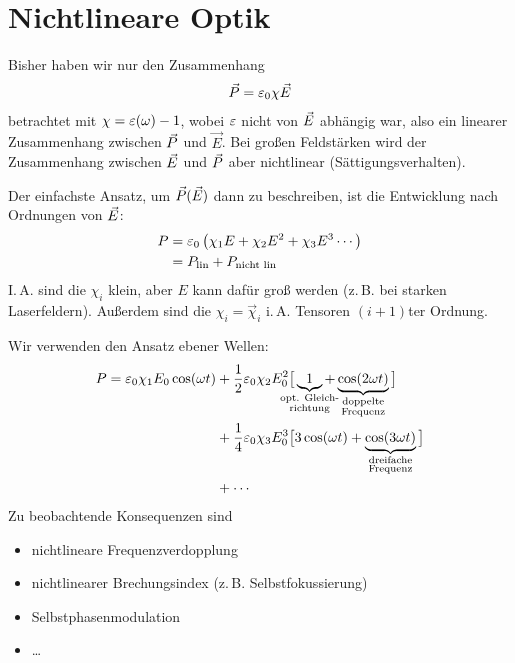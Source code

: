 
\chapter{Nichtlineare Optik}

Bisher haben wir nur den Zusammenhang
\begin{gather*}
  \vec{P} = \varepsilon_0\chi\vec{E}
\end{gather*}
betrachtet mit $\chi=\varepsilon(\omega)-1$, wobei $\varepsilon$ nicht von $\vec{E}$
abhängig war, also ein linearer Zusammenhang zwischen $\vec{P} $ und
$\vec E$.
Bei großen Feldstärken wird der Zusammenhang zwischen $\vec{E} $ und
$\vec{P} $ aber nichtlinear (Sättigungsverhalten).

Der einfachste Ansatz, um $\vec{P}(\vec{E})$ dann zu beschreiben, ist die
Entwicklung nach Ordnungen von $\vec{E} $:
\begin{align*}
  P &= \varepsilon_0 \left(
      \chi_1 E + \chi_2 E^2 + \chi_3 E^3 \dotsb
       \right) \\
    &= P_\text{lin} + P_\text{nicht lin}
\end{align*}
I.\,A. sind die $\chi_i$ klein, aber $E$ kann dafür groß werden
(z.\,B. bei starken Laserfeldern).
Außerdem sind die $\chi_i=\vec{\chi}_i$ i.\,A. Tensoren $(i+1)$ter
Ordnung.

Wir verwenden den Ansatz ebener Wellen:
\begin{align*}
  P = \epso \chi_1 E_0\cos(\omega t) 
  &+ \frac{1}{2}\epso\chi_2 E_0^2 \big[ 
  \underbrace{1}_{\mathclap{\substack{\text{opt. Gleich-}\\\text{richtung}}}} +
  \underbrace{\cos(2\omega t)}_{\substack{\text{doppelte}\\ \text{Frequenz}}}
  \big]\\
  &+ \frac{1}{4}\epso\chi_3 E_0^3 \big[
  3\cos(\omega t) + 
  \underbrace{\cos(3\omega t)}_{\substack{\text{dreifache}\\\text{Frequenz}}}
  \big]\\
  &+ \dotsb
\end{align*}
Zu beobachtende Konsequenzen sind
\begin{itemize}
\item nichtlineare Frequenzverdopplung
\item nichtlinearer Brechungsindex (z.\,B. Selbstfokussierung)
\item Selbstphasenmodulation
\item \dots
\end{itemize}



